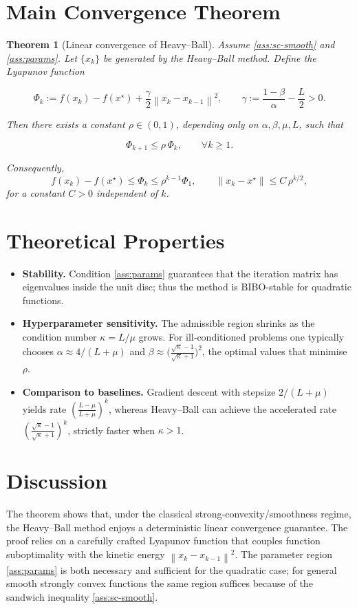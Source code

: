 \documentclass{article}
\newtheorem{theorem}{Theorem}
\newcommand{\norm}[1]{\left\lVert#1\right\rVert}
\begin{document}
\section*{Main Convergence Theorem}
\begin{theorem}[Linear convergence of Heavy–Ball]\label{thm:hb}
Assume \ref{ass:sc-smooth} and \ref{ass:params}.  
Let $\{x_k\}$ be generated by the Heavy–Ball method. Define the Lyapunov function  

\[
\Phi_k:=f(x_k)-f(x^{\star})+\frac{\gamma}{2}\norm{x_k-x_{k-1}}^{2},
\qquad\gamma:=\frac{1-\beta}{\alpha}-\frac{L}{2}>0 .
\]

Then there exists a constant $\rho\in(0,1)$, depending only on $\alpha,\beta,\mu,L$, such that  

\[
\Phi_{k+1}\le\rho\,\Phi_k,\qquad\forall k\ge 1.
\]

Consequently,
\[
f(x_k)-f(x^{\star})\le \Phi_k\le \rho^{k-1}\Phi_1,
\qquad 
\norm{x_k-x^{\star}}\le C\,\rho^{k/2},
\]
for a constant $C>0$ independent of $k$.
\end{theorem}

\section*{Theoretical Properties}
\begin{itemize}
\item \textbf{Stability.} Condition \eqref{ass:params} guarantees that the iteration matrix has eigenvalues inside the unit disc; thus the method is BIBO‑stable for quadratic functions.
\item \textbf{Hyperparameter sensitivity.} The admissible region shrinks as the condition number $\kappa=L/\mu$ grows. For ill‑conditioned problems one typically chooses $\alpha\approx 4/(L+\mu)$ and $\beta\approx\bigl(\frac{\sqrt{\kappa}-1}{\sqrt{\kappa}+1}\bigr)^{2}$, the optimal values that minimise $\rho$.
\item \textbf{Comparison to baselines.} Gradient descent with stepsize $2/(L+\mu)$ yields rate $(\frac{L-\mu}{L+\mu})^{k}$, whereas Heavy–Ball can achieve the accelerated rate $(\frac{\sqrt{\kappa}-1}{\sqrt{\kappa}+1})^{k}$, strictly faster when $\kappa>1$.
\end{itemize}

\section*{Discussion}
The theorem shows that, under the classical strong‑convexity/smoothness regime, the Heavy–Ball method enjoys a deterministic linear convergence guarantee. The proof relies on a carefully crafted Lyapunov function that couples function suboptimality with the kinetic energy $\norm{x_k-x_{k-1}}^{2}$. The parameter region \eqref{ass:params} is both necessary and sufficient for the quadratic case; for general smooth strongly convex functions the same region suffices because of the sandwich inequality \eqref{ass:sc-smooth}.
\end{document}
